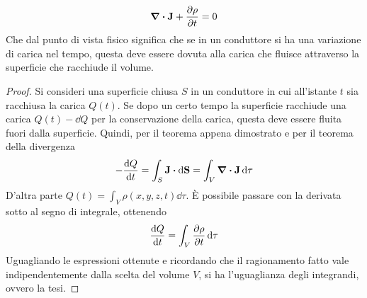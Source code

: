 \begin{cor}
    \begin{equation}
        \label{eqn:continuità}
        \div{\vb{J}}+\pdv{\rho}{t}=0
    \end{equation}
    Che dal punto di vista fisico significa che se in un conduttore si ha una variazione di carica nel tempo,
    questa deve essere dovuta alla carica che fluisce attraverso la superficie che racchiude il volume.
\end{cor}
\begin{proof}
    Si consideri una superficie chiusa $S$ in un conduttore in cui all'istante $t$ sia racchiusa la carica $Q(t)$.
    Se dopo un certo tempo la superficie racchiude una carica $Q(t)-\dd{Q}$ per la conservazione della carica,
    questa deve essere fluita fuori dalla superficie. Quindi, per il teorema appena dimostrato e per il teorema della divergenza
    \[
        -\dv{Q}{t}=\int_S\vb{J}\vdot\dd{\vb{S}}=\int_V\div{\vb{J}}\dd{\tau}
    \]
    D'altra parte $Q(t)=\int_V \rho(x,y,z,t)\dd{\tau}$. È possibile passare con la derivata sotto al segno di integrale, ottenendo
    \[
        \dv{Q}{t}=\int_V\pdv{\rho}{t}\dd{\tau}
    \]
    Uguagliando le espressioni ottenute e ricordando che il ragionamento fatto vale indipendentemente dalla scelta del volume $V$,
    si ha l'uguaglianza degli integrandi, ovvero la tesi.
\end{proof}

